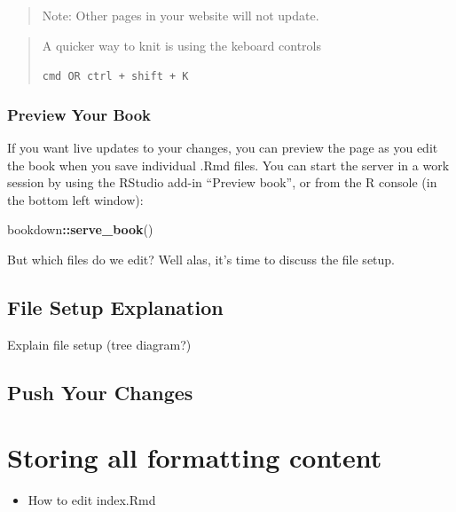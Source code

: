 \documentclass[
]{book}
\newenvironment{Shaded}{\begin{snugshade}}{\end{snugshade}}
\newcommand{\FunctionTok}[1]{\textcolor[rgb]{0.13,0.29,0.53}{\textbf{#1}}}
\newcommand{\NormalTok}[1]{#1}
\newcommand{\SpecialCharTok}[1]{\textcolor[rgb]{0.81,0.36,0.00}{\textbf{#1}}}
\providecommand{\tightlist}{%
  \setlength{\itemsep}{0pt}\setlength{\parskip}{0pt}}
\theoremstyle{definition}
\theoremstyle{definition}
\theoremstyle{definition}
\theoremstyle{definition}
\theoremstyle{remark}
\begin{document}
\begin{quote}
Note: Other pages in your website will not update.
\end{quote}

\begin{quote}
A quicker way to knit is using the keboard controls

\texttt{cmd\ OR\ ctrl\ +\ shift\ +\ K}
\end{quote}

\subsection{Preview Your Book}\label{preview-your-book}

If you want live updates to your changes, you can preview the page as you edit the book when you save individual .Rmd files. You can start the server in a work session by using the RStudio add-in ``Preview book'', or from the R console (in the bottom left window):

\begin{Shaded}
\begin{Highlighting}[]
\NormalTok{bookdown}\SpecialCharTok{::}\FunctionTok{serve\_book}\NormalTok{()}
\end{Highlighting}
\end{Shaded}

But which files do we edit? Well alas, it's time to discuss the file setup.

\section{File Setup Explanation}\label{file-setup}

Explain file setup (tree diagram?)

\section{Push Your Changes}\label{push-your-changes}

\chapter{Storing all formatting content}\label{storing-all-formatting-content}

\begin{itemize}
\tightlist
\item
  How to edit index.Rmd
\end{itemize}
\end{document}

